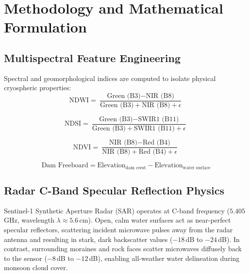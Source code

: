 \documentclass[12pt,a4paper]{report}
\begin{document}
\chapter{Methodology and Mathematical Formulation}

\section{Multispectral Feature Engineering}
Spectral and geomorphological indices are computed to isolate physical cryospheric properties:
\begin{equation}
    \text{NDWI} = \frac{\text{Green (B3)} - \text{NIR (B8)}}{\text{Green (B3)} + \text{NIR (B8)} + \epsilon}
    \label{eq:ndwi}
\end{equation}

\begin{equation}
    \text{NDSI} = \frac{\text{Green (B3)} - \text{SWIR1 (B11)}}{\text{Green (B3)} + \text{SWIR1 (B11)} + \epsilon}
    \label{eq:ndsi}
\end{equation}

\begin{equation}
    \text{NDVI} = \frac{\text{NIR (B8)} - \text{Red (B4)}}{\text{NIR (B8)} + \text{Red (B4)} + \epsilon}
    \label{eq:ndvi}
\end{equation}

\begin{equation}
    \text{Dam Freeboard} = \text{Elevation}_{\text{dam crest}} - \text{Elevation}_{\text{water surface}}
    \label{eq:freeboard}
\end{equation}

\section{Radar C-Band Specular Reflection Physics}
Sentinel-1 Synthetic Aperture Radar (SAR) operates at C-band frequency ($5.405$\,GHz, wavelength $\lambda \approx 5.6$\,cm). Open, calm water surfaces act as near-perfect specular reflectors, scattering incident microwave pulses away from the radar antenna and resulting in stark, dark backscatter values ($-18$\,dB to $-24$\,dB). In contrast, surrounding moraines and rock faces scatter microwaves diffusely back to the sensor ($-8$\,dB to $-12$\,dB), enabling all-weather water delineation during monsoon cloud cover.
\end{document}
